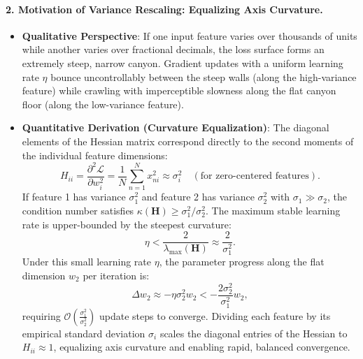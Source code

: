 \paragraph{2. Motivation of Variance Rescaling: Equalizing Axis Curvature.}
\begin{itemize}[leftmargin=*]
  \item \textbf{Qualitative Perspective}: If one input feature varies over thousands of units while another varies over fractional decimals, the loss surface forms an extremely steep, narrow canyon. Gradient updates with a uniform learning rate $\eta$ bounce uncontrollably between the steep walls (along the high-variance feature) while crawling with imperceptible slowness along the flat canyon floor (along the low-variance feature).
  \item \textbf{Quantitative Derivation (Curvature Equalization)}: The diagonal elements of the Hessian matrix correspond directly to the second moments of the individual feature dimensions:
    \begin{equation}
    H_{ii} = \frac{\partial^2 \mathcal{L}}{\partial w_i^2} = \frac{1}{N} \sum_{n=1}^N x_{ni}^2 \approx \sigma_i^2 \quad (\text{for zero-centered features}).
    \end{equation}
    If feature 1 has variance $\sigma_1^2$ and feature 2 has variance $\sigma_2^2$ with $\sigma_1 \gg \sigma_2$, the condition number satisfies $\kappa(\mathbf{H}) \ge \sigma_1^2 / \sigma_2^2$. The maximum stable learning rate is upper-bounded by the steepest curvature:
    \begin{equation}
    \eta < \frac{2}{\lambda_{\max}(\mathbf{H})} \approx \frac{2}{\sigma_1^2}.
    \end{equation}
    Under this small learning rate $\eta$, the parameter progress along the flat dimension $w_2$ per iteration is:
    \begin{equation}
    \Delta w_2 \approx -\eta \sigma_2^2 w_2 < -\frac{2 \sigma_2^2}{\sigma_1^2} w_2,
    \end{equation}
    requiring $\mathcal{O}\left( \frac{\sigma_1^2}{\sigma_2^2} \right)$ update steps to converge. Dividing each feature by its empirical standard deviation $\sigma_i$ scales the diagonal entries of the Hessian to $H_{ii} \approx 1$, equalizing axis curvature and enabling rapid, balanced convergence.
\end{itemize}

